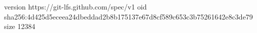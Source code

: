 version https://git-lfs.github.com/spec/v1
oid sha256:4d425d5eceea24dbeddad2b8b175137e67d8cf589c653c3b75261642e8c3de79
size 12384
